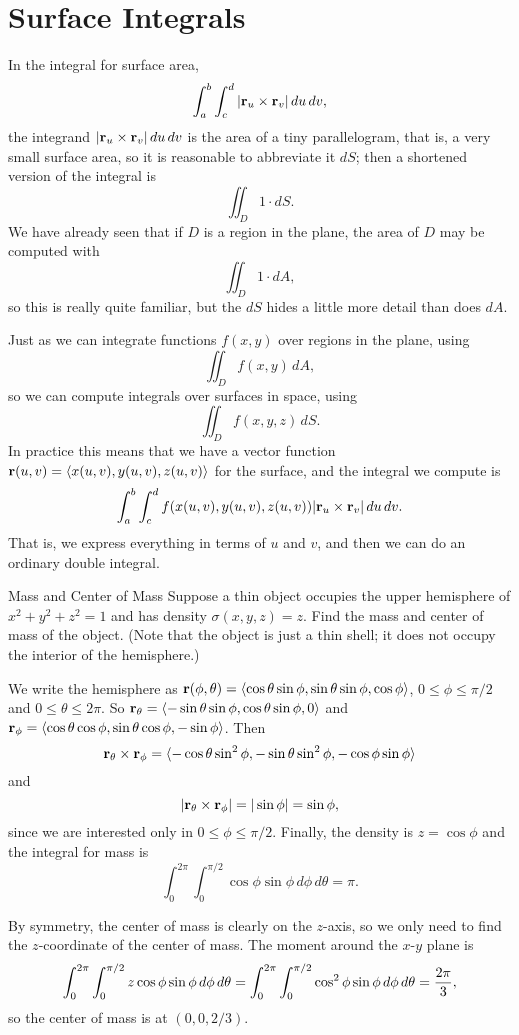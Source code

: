 \section{Surface Integrals}\label{sec:SurfaceIntegrals}

In the integral for surface area,
$$\int_a^b\int_c^d |{\bf r}_u\times{\bf r}_v|\,du\,dv,$$
the integrand $|{\bf r}_u\times{\bf r}_v|\,du\,dv$
is the area of a tiny parallelogram, that is, a very small surface
area, so it is reasonable to abbreviate it $dS$; then a shortened
version of the integral is
$$\iint_{D} 1\cdot dS.$$
We have already seen that if $D$ is a region in the plane, the area of
$D$ may be computed with 
$$\iint_{D} 1\cdot dA,$$
so this is really quite familiar, but the $dS$ hides a little more
detail than does $dA$.

Just as we can integrate functions $f(x,y)$ over regions in the plane,
using
$$\iint_{D} f(x,y)\, dA,$$
so we can compute integrals over surfaces in space, using
$$\iint_{D} f(x,y,z)\, dS.$$
In practice this means that we have a vector function
${\bf r}(u,v)=\langle x(u,v),y(u,v),z(u,v)\rangle$ for the surface,
and the integral we compute is
$$\int_a^b\int_c^d f(x(u,v),y(u,v),z(u,v))|{\bf r}_u\times{\bf
  r}_v|\,du\,dv.$$ 
That is, we express everything in terms of $u$ and $v$, and then we
can do an ordinary double integral.

\begin{example}{Mass and Center of Mass}{}
Suppose a thin object occupies the upper hemisphere of 
$x^2+y^2+z^2=1$ and has density $\sigma(x,y,z)=z$. Find the mass 
and center of mass of the
object. (Note that the object is just a thin shell; it does not occupy
the interior of the hemisphere.)
\end{example}
\begin{solution}
We write the hemisphere as ${\bf r}(\phi,\theta)=
\langle \cos\theta\sin\phi, \sin\theta\sin\phi, \cos\phi\rangle$,
$0\le\phi\le \pi/2$ and $0\le\theta\le 2\pi$. So
${\bf r}_\theta = \langle -\sin\theta\sin\phi, \cos\theta\sin\phi, 0\rangle$
and 
${\bf r}_\phi =\langle \cos\theta\cos\phi, \sin\theta\cos\phi, -\sin\phi\rangle$.
Then
$${\bf r}_\theta\times{\bf r}_\phi =
\langle -\cos\theta\sin^2\phi,-\sin\theta\sin^2\phi,-\cos\phi\sin\phi\rangle$$
and
$$ |{\bf r}_\theta\times{\bf r}_\phi| = |\sin\phi| = \sin\phi,$$
since we are interested only in $0\le\phi\le \pi/2$.
Finally, the density is $z=\cos\phi$ and the integral for mass is
$$\int_0^{2\pi}\int_0^{\pi/2} \cos\phi\sin\phi\,d\phi\,d\theta=\pi.$$

By symmetry, the center of mass is clearly on the $z$-axis, so we only
need to find the $z$-coordinate of the center of mass. The moment
around the $x$-$y$ plane is
$$\int_0^{2\pi}\int_0^{\pi/2} z\cos\phi\sin\phi\,d\phi\,d\theta
=\int_0^{2\pi}\int_0^{\pi/2} \cos^2\phi\sin\phi\,d\phi\,d\theta
={2\pi\over 3},$$
so the center of mass is at $(0,0,2/3)$.
\end{solution}

